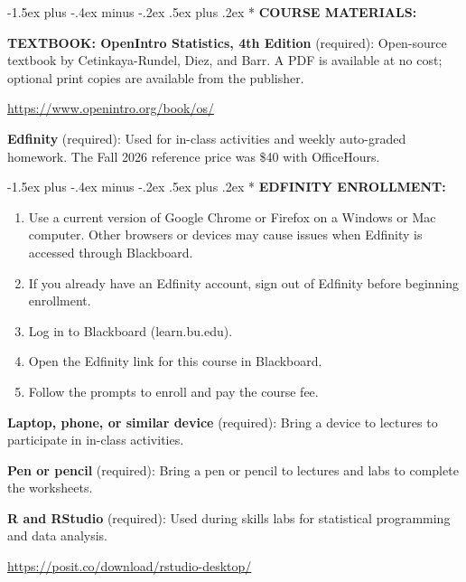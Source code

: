 \documentclass[11pt]{article}
\makeatletter
\renewcommand\section{\@startsection{section}{1}{0pt}%
  {-1.5ex plus -.4ex minus -.2ex}%
  {.5ex plus .2ex}%
  {\normalfont\Large\bfseries}}
\makeatother
\begin{document}
\section*{}
\textbf{COURSE MATERIALS:}

\textbf{TEXTBOOK: OpenIntro Statistics, 4th Edition} (required): Open-source textbook by Ce\-tin\-kaya-\allowbreak Run\-del, Diez, and Barr. A PDF is available at no cost; optional print copies are available from the publisher.

\begin{center}\url{https://www.openintro.org/book/os/}\end{center}

\textbf{Edfinity} (required): Used for in-class activities and weekly auto-graded homework. The Fall 2026 reference price was \$40 with OfficeHours.

\section*{}
\textbf{EDFINITY ENROLLMENT:}
\begin{samepage}
\begin{enumerate}
\item[1.] Use a current version of Google Chrome or Firefox on a Windows or Mac computer. Other browsers or devices may cause issues when Edfinity is accessed through Blackboard.
\item[2.] If you already have an Edfinity account, sign out of Edfinity before beginning enrollment.
\item[3.] Log in to Blackboard (learn.bu.edu).
\item[4.] Open the Edfinity link for this course in Blackboard.
\item[5.] Follow the prompts to enroll and pay the course fee.
\end{enumerate}
\end{samepage}

\textbf{Laptop, phone, or similar device} (required): Bring a device to lectures to participate in in-class activities.

\textbf{Pen or pencil} (required): Bring a pen or pencil to lectures and labs to complete the worksheets.

\textbf{R and RStudio} (required): Used during skills labs for statistical programming and data analysis.

\begin{center}\url{https://posit.co/download/rstudio-desktop/}\end{center}
\end{document}
